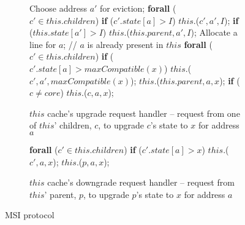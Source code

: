 \begin{figure}
\small

\begin{subfigure}{\linewidth}
\begin{boxedminipage}{\linewidth}
\begin{algorithmic}
        \State Choose address $a'$ for eviction;
        \State \textbf{forall} ($c' \in this.children$)
        \State \;\;\;\; \textbf{if} ($c'.state[a] > I$)
        \State \;\;\;\;\;\;\;\; \call{} $this.$\dReqL($c', a', I$);
        \State \textbf{if} ($this.state[a'] > I$)
        \State \;\;\;\; \call{} $this.$\dResp{}($this.parent, a', I$);
      \EndIf
      \State Allocate a line for $a$;
    \EndIf
    \State // $a$ is already present in $this$
    \State \textbf{forall} ($c' \in this.children$)
    \State \;\;\;\; \textbf{if} ($c'.state[a] > maxCompatible(x)$)
    \State \;\;\;\;\;\;\;\; \call{} $this.$\dReqL($c', a', maxCompatible(x)$);
    \State \call{} $this.$\uReqL{}($this.parent, a, x$);
  \State \textbf{if} ($c \neq core$)
  \State \;\;\;\; \call{} $this$.\uResp{}($c, a, x$);
\EndProc
\end{algorithmic}
\end{boxedminipage}
\caption{$this$ cache's upgrade request handler -- request from one of $this$' children, $c$, to upgrade $c$'s state to $x$ for address $a$ }
\label{atomicUReq1}
\end{subfigure}

\begin{subfigure}{\linewidth}
\begin{boxedminipage}{\linewidth}
\begin{algorithmic}
    \State \textbf{forall} ($c' \in this.children$)
    \State \;\;\;\; \textbf{if} ($c'.state[a] > x$)
    \State \;\;\;\;\;\;\;\; \call{} $this.$\dReqL($c', a, x$);
    \State \call{} $this.$\dResp($p, a, x$);
  \EndIf
\EndProc
\end{algorithmic}
\end{boxedminipage}
\caption{$this$ cache's downgrade request handler -- request from $this$'
parent, $p$, to upgrade $p$'s state to $x$ for address $a$ }
\label{atomicDReq1}
\end{subfigure}

\caption{MSI protocol}
\label{msi-template}
\end{figure}

